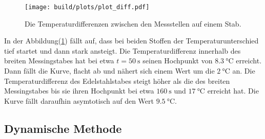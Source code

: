         \begin{figure}[H]
          \centering
          \texttt{[image: build/plots/plot\_diff.pdf]}
          \caption{Die Temperaturdifferenzen zwischen den Messstellen auf einem Stab.}
          \label{fig:plot_diff}
        \end{figure}

        In der Abbildung(\ref{fig:plot_diff}) fällt auf, dass bei beiden Stoffen der Temperaturunterschied tief startet und dann stark ansteigt.
        Die Temperaturdifferenz innerhalb des breiten Messingstabes hat bei etwa $ t = \SI{50}{\second}$ seinen Hochpunkt von $\SI{8.3}{\celsius}$ erreicht.
        Dann fällt die Kurve, flacht ab und nähert sich einem Wert um die $\SI{2}{\celsius}$ an.
        Die Temperaturdifferenz des Edelstahlstabes steigt höher als die des breiten Messingstabes bis sie ihren Hochpunkt 
        bei etwa $\SI{160}{\second} $ und $\SI{17}{\celsius}$ erreicht hat.
        Die Kurve fällt daraufhin asymtotisch auf den Wert $\SI{9.5}{\celsius}$.

    \subsection{Dynamische Methode}









